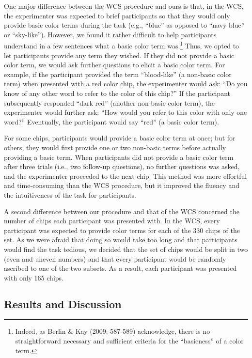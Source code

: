\documentclass[,man,floatsintext]{apa6}
\let\rmarkdownfootnote\footnote%
\def\footnote{\protect\rmarkdownfootnote}
\theoremstyle{definition}
\theoremstyle{definition}
\theoremstyle{definition}
\theoremstyle{remark}
\begin{document}
One major difference between the WCS procedure and ours is that, in the
WCS, the experimenter was expected to brief participants so that they
would only provide basic color terms during the task (e.g.,
\enquote{blue} as opposed to \enquote{navy blue} or \enquote{sky-like}).
However, we found it rather difficult to help participants understand in
a few sentences what a basic color term was.\footnote{Indeed, as Berlin
  \& Kay (2009: 587-589) acknowledge, there is no straightforward
  necessary and sufficient criteria for the \enquote{basicness} of a
  color term.} Thus, we opted to let participants provide any term they
wished. If they did not provide a basic color term, we would ask further
questions to elicit a basic color term. For example, if the participant
provided the term \enquote{blood-like} (a non-basic color term) when
presented with a red color chip, the experimenter would ask: \enquote{Do
you know of any other word to refer to the color of this chip?} If the
participant subsequently responded \enquote{dark red} (another non-basic
color term), the experimenter would further ask: \enquote{How would you
refer to this color with only one word?} Eventually, the participant
would say \enquote{red} (a basic color term).

For some chips, participants would provide a basic color term at once;
but for others, they would first provide one or two non-basic terms
before actually providing a basic term. When participants did not
provide a basic color term after three trials (i.e., two follow-up
questions), no further questions was asked, and the experimenter
proceeded to the next chip. This method was more effortful and
time-consuming than the WCS procedure, but it improved the fluency and
the intuitiveness of the task for participants.

A second difference between our procedure and that of the WCS concerned
the number of chips each participant was presented with. In the WCS,
every participant was expected to provide color terms for each of the
330 chips of the set. As we were afraid that doing so would take too
long and that participants would find the task tedious, we decided that
the set of chips would be split in two (even and uneven numbers) and
that every participant would be randomly ascribed to one of the two
subsets. As a result, each participant was presented with only 165
chips.

\subsection{Results and Discussion}\label{results-and-discussion}
\end{document}
